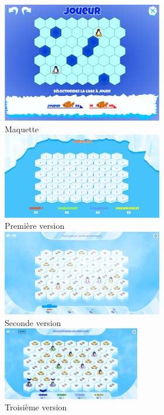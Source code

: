 \documentclass{report}
\begin{document}
\newpage
\begin{center}
  \includegraphics[width=7cm]{image/ancienPlateau.pdf}
  \\
  Maquette
  \\
  \vspace{1cm}
  \includegraphics[width=7cm]{image/version2.png}
  \\
  Première version
  \\
   \vspace{1cm}
  \includegraphics[width=7cm]{image/version3.png}
  \\
  Seconde version
  \\
   \vspace{1cm}
  \includegraphics[width=6cm]{image/version4.png}
  \\
  Troisième version
  \\
\end{center}
\end{document}
